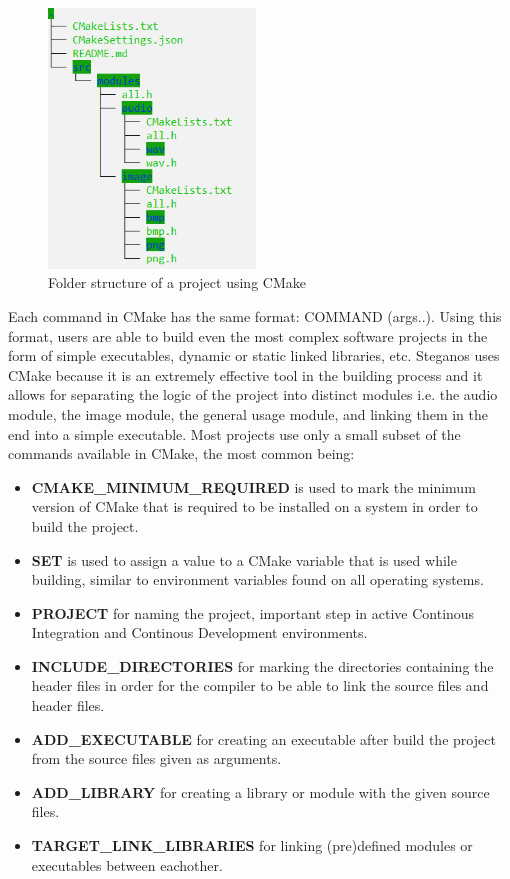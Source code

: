 \begin{figure}[H]
    \centering
    \includegraphics[height=6.9cm,keepaspectratio]{pics/cmake_folder_structure_example}
    \caption{Folder structure of a project using CMake}
\end{figure}

Each command in CMake has the same format: COMMAND (args..). Using this format, users are able to build even the most complex software projects in the form of simple executables, dynamic or static linked libraries, etc. Steganos uses CMake because it is an extremely effective tool in the building process and it allows for separating the logic of the project into distinct modules i.e. the audio module, the image module, the general usage module, and linking them in the end into a simple executable. Most projects use only a small subset of the commands available in CMake, the most common being:

\begin{itemize}
  \item \textbf{CMAKE\_MINIMUM\_REQUIRED} is used to mark the minimum version of CMake that is required to be installed on a system in order to build the project.
  \item \textbf{SET} is used to assign a value to a CMake variable that is used while building, similar to environment variables found on all operating systems.
  \item \textbf{PROJECT} for naming the project, important step in active Continous Integration and Continous Development environments.
  \item \textbf{INCLUDE\_DIRECTORIES} for marking the directories containing the header files in order for the compiler to be able to link the source files and header files.
  \item \textbf{ADD\_EXECUTABLE} for creating an executable after build the project from the source files given as arguments.
  \item \textbf{ADD\_LIBRARY} for creating a library or module with the given source files.
  \item \textbf{TARGET\_LINK\_LIBRARIES} for linking (pre)defined modules or executables between eachother.
\end{itemize}


